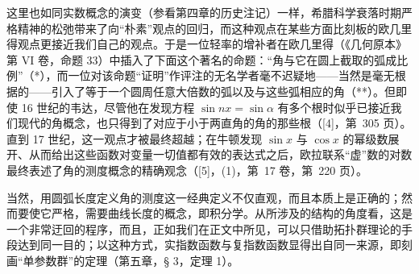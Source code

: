 这里也如同实数概念的演变（参看第四章的历史注记）一样，希腊科学衰落时期严格精神的松弛带来了向“朴素”观点的回归，而这种观点在某些方面比刻板的欧几里得观点更接近我们自己的观点。于是一位轻率的增补者在欧几里得（《几何原本》第 VI 卷，命题 33）中插入了下面这个著名的命题：“角与它在圆上截取的弧成比例”（*），而一位对该命题“证明”作评注的无名学者毫不迟疑地——当然是毫无根据的——引入了等于一个圆周任意大倍数的弧以及与这些弧相应的角（**）。但即使 16 世纪的韦达，尽管他在发现方程 \(\sin nx = \sin \alpha\) 有多个根时似乎已接近我们现代的角概念，也只得到了对应于小于两直角的角的那些根（{[}4{]}，第~305 页）。直到 17 世纪，这一观点才被最终超越；在牛顿发现 \(\sin x\) 与 \(\cos x\) 的幂级数展开、从而给出这些函数对变量一切值都有效的表达式之后，欧拉联系“虚”数的对数最终表述了角的测度概念的精确观念（{[}5{]}，(1)，第~17 卷，第~220 页）。

当然，用圆弧长度定义角的测度这一经典定义不仅直观，而且本质上是正确的；然而要使它严格，需要曲线长度的概念，即积分学。从所涉及的结构的角度看，这是一个非常迂回的程序，而且，正如我们在正文中所见，可以只借助拓扑群理论的手段达到同一目的；以这种方式，实指数函数与复指数函数显得出自同一来源，即刻画“单参数群”的定理（第五章，§ 3，定理 1）。

